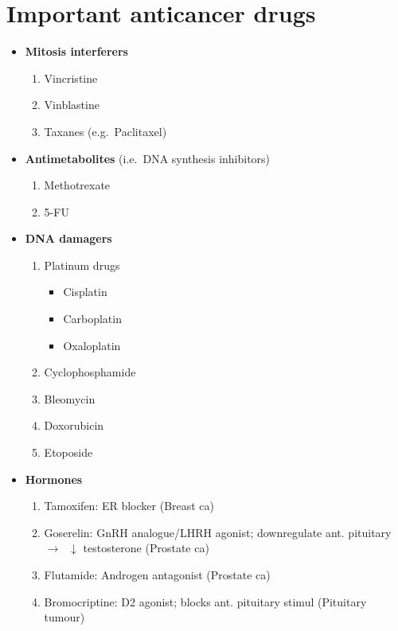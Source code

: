 \documentclass[
  14pt,
]{memoir}
\providecommand{\tightlist}{%
  \setlength{\itemsep}{0pt}\setlength{\parskip}{0pt}}
\begin{document}
\pagebreak

\hypertarget{important-anticancer-drugs}{%
\chapter{Important anticancer drugs}\label{important-anticancer-drugs}}

\begin{itemize}
\tightlist
\item
  \textbf{Mitosis interferers}

  \begin{enumerate}
  \def\labelenumi{\arabic{enumi}.}
  \tightlist
  \item
    Vincristine
  \item
    Vinblastine
  \item
    Taxanes (e.g.~Paclitaxel)
  \end{enumerate}
\item
  \textbf{Antimetabolites} (i.e.~DNA synthesis inhibitors)

  \begin{enumerate}
  \def\labelenumi{\arabic{enumi}.}
  \tightlist
  \item
    Methotrexate
  \item
    5-FU
  \end{enumerate}
\item
  \textbf{DNA damagers}

  \begin{enumerate}
  \def\labelenumi{\arabic{enumi}.}
  \tightlist
  \item
    Platinum drugs

    \begin{itemize}
    \tightlist
    \item
      Cisplatin
    \item
      Carboplatin
    \item
      Oxaloplatin
    \end{itemize}
  \item
    Cyclophosphamide
  \item
    Bleomycin
  \item
    Doxorubicin
  \item
    Etoposide
  \end{enumerate}
\item
  \textbf{Hormones}

  \begin{enumerate}
  \def\labelenumi{\arabic{enumi}.}
  \tightlist
  \item
    Tamoxifen: ER blocker (Breast ca)
  \item
    Goserelin: GnRH analogue/LHRH agonist; downregulate ant. pituitary
    \(\rightarrow\;\;\downarrow\) testosterone (Prostate ca)
  \item
    Flutamide: Androgen antagonist (Prostate ca)
  \item
    Bromocriptine: D2 agonist; blocks ant. pituitary stimul (Pituitary
    tumour)
  \end{enumerate}
\end{itemize}
\end{document}
